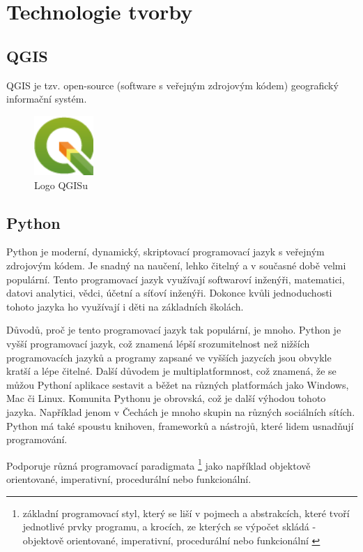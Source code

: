 \chapter{Technologie tvorby}
\label{4-technologie}

\section{QGIS}

QGIS je tzv. open-source (software s veřejným zdrojovým kódem) geografický informační systém.


\begin{figure}[H] \centering
    \includegraphics[width=64pt]{./pictures/qgis-logo.png}
    \caption[Logo QGISu]{Logo QGISu \cite{qgis}}
	\label{fig:qgis-logo}                                
\end{figure}

\section{Python}
Python je moderní, dynamický, skriptovací programovací jazyk s veřejným zdrojovým kódem. 
Je snadný na naučení, lehko čitelný a v současné době velmi populární. Tento programovací jazyk využívají
softwaroví inženýři, matematici, datovi analytici, vědci, účetní a síťoví inženýři.
Dokonce kvůli jednoduchosti tohoto jazyka ho využívají i děti na základních školách.

Důvodů, proč je tento programovací jazyk tak populární, je mnoho. Python je vyšší programovací jazyk,
což znamená lépší srozumitelnost než nižších programovacích jazyků a programy zapsané
ve vyšších jazycích jsou obvykle kratší a lépe čitelné.  Další důvodem je multiplatformnost,
což znamená, že se můžou Pythoní aplikace sestavit a běžet na různých platformách jako 
Windows, Mac či Linux. Komunita Pythonu je obrovská, což je další výhodou tohoto jazyka.
Například jenom v Čechách je mnoho skupin na různých sociálních sítích.
Python má také spoustu knihoven, frameworků a nástrojů, které lidem usnadňují programování.

Podporuje různá programovací paradigmata
\footnote{základní programovací styl, který se liší v pojmech a abstrakcích,
které tvoří jednotlivé prvky programu, a krocích, ze kterých se výpočet skládá  
- objektově orientované, imperativní, procedurální nebo funkcionální \cite{wikipedia-paradigma}} 
jako například objektově orientované, imperativní, procedurální nebo funkcionální.

